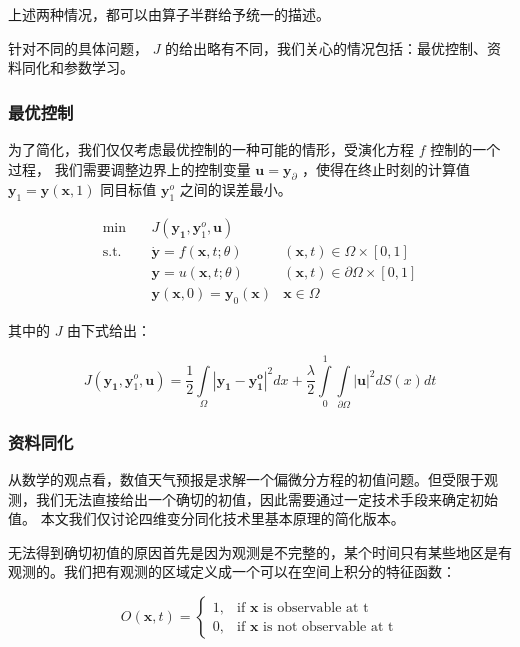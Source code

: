 \documentclass[a4paper,12pt]{article}
\begin{document}
上述两种情况，都可以由算子半群给予统一的描述。

针对不同的具体问题， $ J $ 的给出略有不同，我们关心的情况包括：最优控制、资料同化和参数学习。

\subsubsection{最优控制}

为了简化，我们仅仅考虑最优控制的一种可能的情形，受演化方程 $ f $ 控制的一个过程，
我们需要调整边界上的控制变量 $ \mathbf{u} = \mathbf{y}_{\partial} $ ，使得在终止时刻的计算值 $ \mathbf{y}_1 = \mathbf{y}(\mathbf{x}, 1)$ 同目标值 $ \mathbf{y}_1^o $ 之间的误差最小。

$$
\begin{array}{rcll}
\min &~& J(\mathbf{y_1}, \mathbf{y}_1^o, \mathbf{u}) & \\
\mathrm{s.t.} &~& \dot{\mathbf{y}} = f(\mathbf{x}, t; \theta) & (\mathbf{x}, t) \in \Omega \times [0, 1] \\
&~& \mathbf{y} = u(\mathbf{x}, t; \theta) & (\mathbf{x}, t) \in \partial \Omega \times [0, 1] \\
&~& \mathbf{y}(\mathbf{x}, 0) = \mathbf{y}_0(\mathbf{x}) & \mathbf{x} \in \Omega
\end{array}
$$

其中的 $ J $ 由下式给出：

$$
J(\mathbf{y_1}, \mathbf{y}_1^o, \mathbf{u}) = \frac{1}{2} \int\limits_{\Omega}|\mathbf{y_1} - \mathbf{y_1^o}|^2dx +  \frac{\lambda}{2} \int\limits_{0}^{1}\int\limits_{\partial \Omega} |\mathbf{u}|^2 dS(x) dt
$$


\subsubsection{资料同化}

从数学的观点看，数值天气预报是求解一个偏微分方程的初值问题。但受限于观测，我们无法直接给出一个确切的初值，因此需要通过一定技术手段来确定初始值。
本文我们仅讨论四维变分同化技术里基本原理的简化版本。

无法得到确切初值的原因首先是因为观测是不完整的，某个时间只有某些地区是有观测的。我们把有观测的区域定义成一个可以在空间上积分的特征函数：

$$
O(\mathbf{x}, t) = \begin{cases}
1, & \text{if }\mathbf{x} \text{ is observable at t} \\
0, & \text{if }\mathbf{x} \text{ is not observable at t}
\end{cases}
$$
\end{document}
